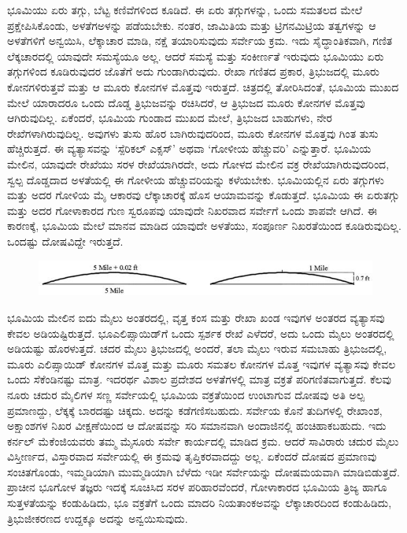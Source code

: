 ಭೂಮಿಯು ಏರು ತಗ್ಗು, ಬೆಟ್ಟ ಕಣಿವೆಗಳಿಂದ ಕೂಡಿದೆ. ಈ ಏರು ತಗ್ಗುಗಳನ್ನು, ಒಂದು ಸಮತಲದ ಮೇಲೆ ಪ್ರಕ್ಷೇಪಿಸಿಕೊಂಡು, ಅಳತೆಗಅಳನ್ನು ಪಡೆಯಬೇಕು. ನಂತರ, ಜಾಮಿತಿಯ ಮತ್ತು ಟ್ರಿಗನಮಿಟ್ರಿಯ ತತ್ವಗಳನ್ನು ಆ ಅಳತೆಗಳಿಗೆ ಅನ್ವಯಿಸಿ, ಲೆಕ್ಕಾಚಾರ ಮಾಡಿ, ನಕ್ಷೆ ತಯಾರಿಸುವುದು ಸರ್ವೇಯ ಕ್ರಮ. ಇದು ಸೈದ್ಧಾಂತಿಕವಾಗಿ, ಗಣಿತ ಲೆಕ್ಕಚಾರದಲ್ಲಿ ಯಾವುದೇ ಸಮಸ್ಯೆಯೂ ಅಲ್ಲ. ಆದರೆ ಸಮಸ್ಯೆ ಮತ್ತು ಸಂಕೀರ್ಣತೆ ಇರುವುದು ಭೂಮಿಯು ಏರು ತಗ್ಗುಗಳಿಂದ ಕೂಡಿರುವುದರ ಜೊತೆಗೆ ಅದು ಗುಂಡಾಗಿರುವುದು. ರೇಖಾ ಗಣಿತದ ಪ್ರಕಾರ, ತ್ರಿಭುಜದಲ್ಲಿ ಮೂರು ಕೋನಗಳಿರುತ್ತವೆ ಮತ್ತು ಆ ಮೂರು ಕೋನಗಳ ಮೊತ್ತವು  ಇರುತ್ತದೆ. ಚಿತ್ರದಲ್ಲಿ ತೋರಿಸಿದಂತೆ, ಭೂಮಿಯ ಮುಖದ ಮೇಲೆ ಯಾರಾದರೂ ಒಂದು ದೊಡ್ಡ ತ್ರಿಭುಜವನ್ನು ರಚಿಸಿದರೆ, ಆ ತ್ರಿಭುಜದ ಮೂರು ಕೋನಗಳ ಮೊತ್ತವು  ಆಗಿರುವುದಿಲ್ಲ. ಏಕೆಂದರೆ, ಭೂಮಿಯ ಗುಂಡಾದ ಮುಖದ ಮೇಲೆ, ತ್ರಿಭುಜದ ಬಾಹುಗಳು, ನೇರ ರೇಖೆಗಳಾಗಿರುವುದಿಲ್ಲ. ಅವುಗಳು ತುಸು ಹೊರ ಬಾಗಿರುವುದರಿಂದ, ಮೂರು ಕೋನಗಳ ಮೊತ್ತವು  ಗಿಂತ ತುಸು ಹೆಚ್ಚಿರುತ್ತದೆ. ಈ ವ್ಯತ್ಯಾಸವನ್ನು ‘ಸ್ಪೆರಿಕಲ್​ ಎಕ್ಸಸ್​’ ಅಥವಾ ‘ಗೋಳೀಯ ಹೆಚ್ಚುವರಿ’ ಎನ್ನುತ್ತಾರೆ. ಭೂಮಿಯ ಮೇಲಿನ, ಯಾವುದೇ ರೇಖೆಯು ಸರಳ ರೇಖೆಯಾಗಿರದೇ, ಅದು ಗೋಳದ ಮೇಲಿನ ವಕ್ರ ರೇಖೆಯಾಗಿರುವುದರಿಂದ, ಸ್ವಲ್ಪ ದೊಡ್ಡದಾದ ಅಳತೆಯಲ್ಲಿ ಈ ಗೋಳೀಯ ಹೆಚ್ಚುವರಿಯನ್ನು ಕಳೆಯಬೇಕು. ಭೂಮಿಯಲ್ಲಿನ ಏರು ತಗ್ಗುಗಳು ಮತ್ತು ಅದರ ಗೋಳಿಯ ಮೈ ಆಕಾರವು ಲೆಕ್ಕಾಚಾರಕ್ಕೆ ಹೊಸ ಆಯಾಮವನ್ನು ಕೊಡುತ್ತದೆ. ಭೂಮಿಯ ಈ ಏರುತಗ್ಗು ಮತ್ತು ಅದರ ಗೋಳಾಕಾರದ ಗುಣ ಸ್ವರೂಪವು ಯಾವುದೇ ನಿಖರವಾದ ಸರ್ವೇಗೆ ಒಂದು ಶಾಪವೇ ಆಗಿದೆ. ಈ ಕಾರಣಕ್ಕೆ, ಭೂಮಿಯ ಮೇಲೆ ಮಾನವ ಮಾಡಿದ ಯಾವುದೇ ಅಳತೆಯು, ಸಂಪೂರ್ಣ ನಿಖರತೆಯಿಂದ ಕೂಡಿರುವುದಿಲ್ಲ. ಒಂದಷ್ಟು ದೋಷವಿದ್ದೇ ಇರುತ್ತದೆ.

\begin{figure}
\includegraphics[scale=0.6]{"images/image002.jpg"}
\end{figure}

ಭೂಮಿಯ ಮೇಲಿನ ಐದು ಮೈಲು ಅಂತರದಲ್ಲಿ, ವೃತ್ತ ಕಂಸ ಮತ್ತು ರೇಖಾ ಖಂಡ ಇವುಗಳ ಅಂತರದ ವ್ಯತ್ಯಾಸವು ಕೇವಲ  ಅಡಿಯಷ್ಟಿರುತ್ತದೆ. ಭೂಎಲಿಪ್ಸಾಯಿಡ್​ಗೆ ಒಂದು ಸ್ಪರ್ಶಕ ರೇಖೆ ಎಳೆದರೆ, ಅದು ಒಂದು ಮೈಲು ಅಂತರದಲ್ಲಿ  ಅಡಿಯಷ್ಟು ಹೊರಳುತ್ತದೆ.  ಚದರ ಮೈಲು ತ್ರಿಭುಜದಲ್ಲಿ ಅಂದರೆ, ತಲಾ  ಮೈಲು ಇರುವ ಸಮಬಾಹು ತ್ರಿಭುಜದಲ್ಲಿ, ಮೂರು ಎಲಿಪ್ಸಾಯಿಡ್​ ಕೋನಗಳ ಮೊತ್ತ ಮತ್ತು ಮೂರು ಸಮತಲ ಕೋನಗಳ ಮೊತ್ತ ಇವುಗಳ ವ್ಯತ್ಯಾಸವು ಕೇವಲ ಒಂದು ಸೆಕೆಂಡಿನಷ್ಟು ಮಾತ್ರ. ಇದರರ್ಥ ವಿಶಾಲ ಪ್ರದೇಶದ ಅಳತೆಗಳಲ್ಲಿ ಮಾತ್ರ ವಕ್ರತೆ ಪರಿಗಣಿತವಾಗುತ್ತದೆ. ಕೆಲವು ನೂರು ಚದುರ ಮೈಲಿಗಳ ಸಣ್ಣ ಸರ್ವೇಯಲ್ಲಿ ಭೂಮಿಯ ವಕ್ರತೆಯಿಂದ ಉಂಟಾಗುವ ದೋಷವು ಅತಿ ಅಲ್ಪ ಪ್ರಮಾಣದ್ದು, ಲೆಕ್ಕಕ್ಕೆ ಬಾರದಷ್ಟು ಚಿಕ್ಕದು. ಅದನ್ನು ಕಡೆಗಣಿಸಬಹುದು. ಸರ್ವೇಯ ಕೊನೆ ತುದಿಗಳಲ್ಲಿ ರೇಖಾಂಶ, ಅಕ್ಷಾಂಶಗಳ ನಿಖರ ವೀಕ್ಷಣೆಯಿಂದ ಆ ದೋಷವನ್ನು ಸರಿ ಸಮಾನವಾಗಿ ಅಂದಾಜಿನಲ್ಲಿ ಹಂಚಿಹಾಕಬಹುದು. ಇದು ಕರ್ನಲ್​ ಮೆಕೆಂಜಿಯವರು ತಮ್ಮ ಮೈಸೂರು ಸರ್ವೇ ಕಾರ್ಯದಲ್ಲಿ ಮಾಡಿದ ಕ್ರಮ. ಆದರೆ ಸಾವಿರಾರು ಚದುರ ಮೈಲು ವಿಸ್ತೀರ್ಣದ, ವಿಸ್ತಾರವಾದ ಸರ್ವೇಯಲ್ಲಿ ಈ ಕ್ರಮವು ತೃಪ್ತಿಕರವಾದದ್ದು ಅಲ್ಲ. ಏಕೆಂದರೆ ದೋಷದ ಪ್ರಮಾಣವು ಸಂಚಿತಗೊಂಡು, ಇಮ್ಮಡಿಯಾಗಿ ಮುಮ್ಮಡಿಯಾಗಿ ಬೆಳೆದು ಇಡೀ ಸರ್ವೇಯನ್ನು ದೋಷಮಯವಾಗಿ ಮಾಡಿಬಿಡುತ್ತದೆ. ಪ್ರಾಚೀನ ಭೂಗೋಳ ತಜ್ಞರು ಇದಕ್ಕೆ ಸೂಚಿಸಿದ ಸರಳ ಪರಿಹಾರವೆಂದರೆ, ಗೋಳಾಕಾರದ ಭೂಮಿಯ ತ್ರಿಜ್ಯ ಹಾಗೂ ಸುತ್ತಳತೆಯನ್ನು ಕಂಡುಹಿಡಿದು, ಭೂ ವಕ್ರತೆಗೆ ಒಂದು ಮಾದರಿ ನಿಯತಾಂಕಅವನ್ನು ಲೆಕ್ಕಾಚಾರದಿಂದ ಕಂಡುಹಿಡಿದು, ತ್ರಿಭುಜೀಕರಣದ ಉದ್ದಕ್ಕೂ ಅದನ್ನು ಅನ್ವಯಿಸುವುದು.

